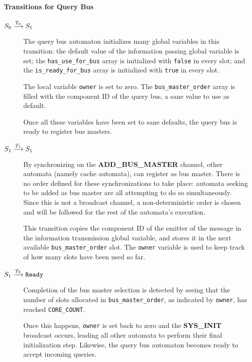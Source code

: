 \paragraph{Transitions for Query Bus}
\begin{description}
\item[$S_0 \xrightarrow[]{T_{0}} S_1$]
   The query bus automaton initializes many global variables in this transition:
   the default value of the information passing global variable is set; the
   \lstinline!has_use_for_bus! array is initialized with \lstinline!false! in
   every slot; and the \lstinline!is_ready_for_bus! array is initialized with
   \lstinline!true! in every slot.

   The local variable \lstinline!owner! is set to zero. The
   \lstinline!bus_master_order! array is filled with the component ID of the
   query bus, a sane value to use as default.

   Once all these variables have been set to sane defaults, the query bus is
   ready to register bus masters.

\item[$S_1 \xrightarrow[]{T_{1}} S_1$]
   By synchronizing on the \textbf{ADD\_BUS\_MASTER} channel, other automata
   (namely cache automata), can register as bus master. There is no order
   defined for these synchronizations to take place: automata seeking to be
   added as bus master are all attempting to do so simultaneously. Since this is
   not a broadcast channel, a non-deterministic order is chosen and will be
   followed for the rest of the automata's execution.

   This transition copies the component ID of the emitter of the message in the
   information transmission global variable, and stores it in the next available
   \lstinline!bus_master_order! slot. The \lstinline!owner! variable is used to
   keep track of how many slots have been used so far.

\item[$S_1 \xrightarrow[]{T_{2}} \texttt{Ready}$]
   Completion of the bus master selection is detected by seeing that the number
   of slots allocated in \lstinline!bus_master_order!, as indicated by
   \lstinline!owner!, has reached \lstinline!CORE_COUNT!.

   Once this happens, \lstinline!owner! is set back to zero and the
   \textbf{SYS\_INIT} broadcast occurs, leading all other automata to perform
   their final initialization step. Likewise, the query bus automaton becomes
   ready to accept incoming queries.


\end{description}
